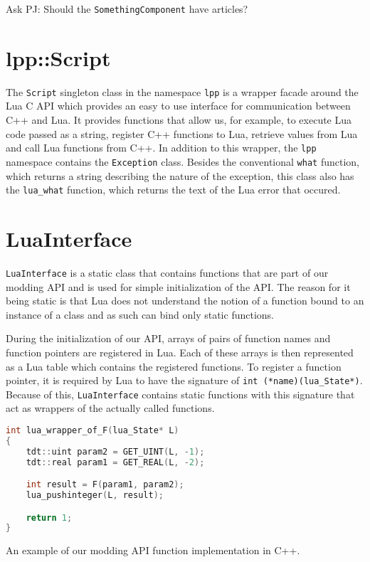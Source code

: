\bigskip
Ask PJ: Should the \texttt{SomethingComponent} have articles?

\section{lpp::Script}

The \texttt{Script} singleton class in the namespace \texttt{lpp} is a wrapper facade around the Lua C API which provides an easy to use
interface for communication between C++ and Lua. It provides functions that allow us, for example, to execute Lua code passed as a string,
register C++ functions to Lua, retrieve values from Lua and call Lua functions from C++. In addition to this wrapper, the \texttt{lpp}
namespace contains the \texttt{Exception} class. Besides the conventional \texttt{what} function, which returns a string describing the
nature of the exception, this class also has the \texttt{lua\_what} function, which returns the text of the Lua error that occured.

\section{LuaInterface}

\texttt{LuaInterface} is a static class that contains functions that are part of our modding API and is used for simple initialization
of the API. The reason for it being static is that Lua does not understand the notion of a function bound to an instance of a class
and as such can bind only static functions.

During the initialization of our API, arrays of pairs of function names and function pointers are registered in Lua. Each of
these arrays is then represented as a Lua table which contains the registered functions.
To register a function pointer, it is required by Lua to have the signature of \texttt{int (*name)(lua\_State*)}. Because of this,
\texttt{LuaInterface} contains static functions with this signature that act as wrappers of the actually called functions.

\begin{listing}[h]
    \centering
    \begin{lstlisting}[language=C++]
int lua_wrapper_of_F(lua_State* L)
{
    tdt::uint param2 = GET_UINT(L, -1);
    tdt::real param1 = GET_REAL(L, -2);

    int result = F(param1, param2);
    lua_pushinteger(L, result);

    return 1;
}
    \end{lstlisting}
    \caption{An example of our modding API function implementation in C++.}
    \label{lua-api-ex}
\end{listing}

